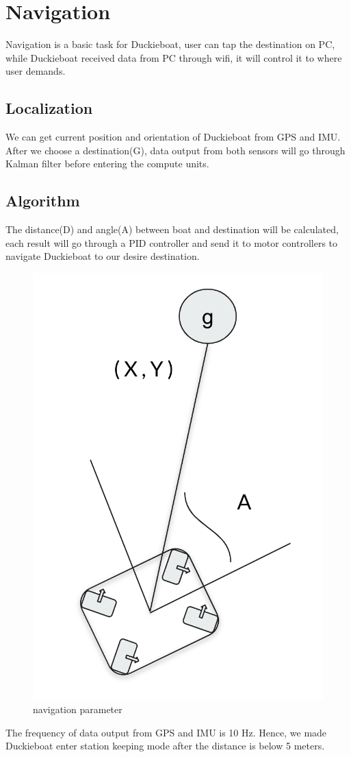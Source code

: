 \section{Navigation}

Navigation is a basic task for Duckieboat, user can tap the destination on PC, while Duckieboat received data from PC through wifi, it will control it to where user demands.

\subsection{Localization}
We can get current position and orientation of Duckieboat from GPS and IMU. After we choose a destination(G), data output from both sensors will go through Kalman filter before entering the compute units. 

\subsection{Algorithm}
The distance(D) and angle(A) between boat and destination will be calculated, each result will go through a PID controller and send it to motor controllers to navigate Duckieboat to our desire destination.

\begin{figure}[h]
	\includegraphics[width=0.5\columnwidth]{images/navigation.png}
	\centering
	\caption{navigation parameter}
	\label{figure:navigation}
\end{figure}

The frequency of data output from GPS and IMU is 10 Hz. Hence, we made Duckieboat enter station keeping mode after the distance is below 5 meters.

